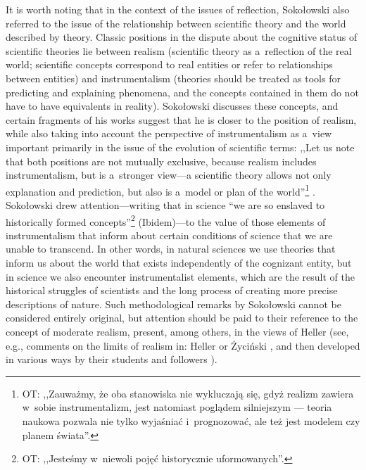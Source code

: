 \documentclass[%
  manuscript=article,
  year=2024,
  volume=77,
  doi=00000.000,
]{zfn}
\begin{document}
It is worth noting that in the context of the issues of reflection, Sokołowski also referred to the issue of the relationship between scientific theory and the world described by theory. Classic positions in the dispute about the cognitive status of scientific theories lie between realism (scientific theory as a~reflection of the real world; scientific concepts correspond to real entities or refer to relationships between entities) and instrumentalism (theories should be treated as tools for predicting and explaining phenomena, and the concepts contained in them do not have to have equivalents in reality). Sokołowski discusses these concepts, and certain fragments of his works suggest that he is closer to the position of realism, while also taking into account the perspective of instrumentalism as a~view important primarily in the issue of the evolution of scientific terms: ,,Let us note that both positions are not mutually exclusive, because realism includes instrumentalism, but is a~stronger view---a scientific theory allows not only explanation and prediction, but also is a~model or plan of the world''\footnote{OT: ,,Zauważmy, że oba stanowiska nie wykluczają się, gdyż realizm zawiera w~sobie instrumentalizm, jest natomiast poglądem silniejszym --- teoria naukowa pozwala nie tylko wyjaśniać i~prognozować, ale też jest modelem czy planem świata''.} 
\parencite[][]{}. %
 Sokołowski drew attention---writing that in science ``we are so enslaved to historically formed concepts''\footnote{OT: ,,Jesteśmy w~niewoli pojęć historycznie uformowanych''.} (Ibidem)---to the value of those elements of instrumentalism that inform about certain conditions of science that we are unable to transcend. In other words, in natural sciences we use theories that inform us about the world that exists independently of the cognizant entity, but in science we also encounter instrumentalist elements, which are the result of the historical struggles of scientists and the long process of creating more precise descriptions of nature. Such methodological remarks by Sokołowski cannot be considered entirely original, but attention should be paid to their reference to the concept of moderate realism, present, among others, in the views of Heller (see, e.g., comments on the limits of realism in: Heller 
\parencite*[][pp.80–81]{Heller1992Filozofia} %
 or Życiński 
\parencite[e.g.,][]{}, %
 and then developed in various ways by their students and followers 
\parencites[e.g.,][]{Sierotowicz1997Realizm}[][]{}%
).
\end{document}
